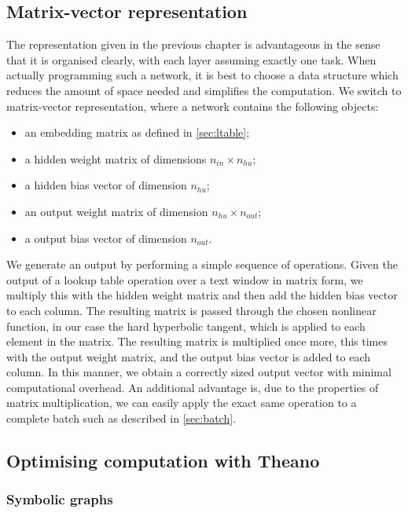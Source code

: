 \subsection{Matrix-vector representation}
\label{sec:matrixvectorreps}
The representation given in the previous chapter is advantageous in
the sense that it is organised clearly, with each layer assuming
exactly one task. When actually programming such a network, it is best
to choose a data structure which reduces the amount of space needed
and simplifies the computation. We switch to matrix-vector
representation, where a network contains the following objects:

\begin{itemize}
\item an embedding matrix as defined in \ref{sec:ltable};
\item a hidden weight matrix of dimensions $n_{in} \times n_{hu}$;
\item a hidden bias vector of dimension $n_{hu}$;
\item an output weight matrix of dimension $n_{hu} \times n_{out}$;
\item a output bias vector of dimension $n_{out}$.
\end{itemize}

We generate an output by performing a simple sequence of
operations. Given the output of a lookup table operation over a text
window in matrix form, we multiply this with the hidden weight matrix
and then add the hidden bias vector to each column. The resulting
matrix is passed through the chosen nonlinear function, in our case the
hard hyperbolic tangent, which is applied to each element in the
matrix. The resulting matrix is multiplied once more, this times with
the output weight matrix, and the output bias vector is added to each
column. In this manner, we obtain a correctly sized output vector with
minimal computational overhead. An additional advantage is, due to the
properties of matrix multiplication, we can easily apply the exact
same operation to a complete batch such as described in
\ref{sec:batch}.

\subsection{Optimising computation with Theano}
\label{sec:theano}

\subsubsection{Symbolic graphs}
\label{sec:graph}
